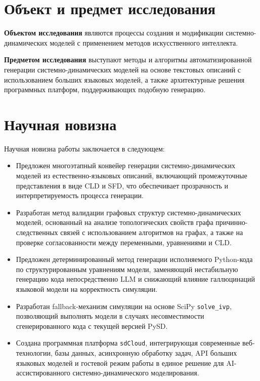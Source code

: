 \section*{Объект и предмет исследования}

\textbf{Объектом исследования} являются процессы создания и модификации системно-динамических моделей с применением методов искусственного интеллекта.

\textbf{Предметом исследования} выступают методы и алгоритмы автоматизированной генерации системно-динамических моделей на основе текстовых описаний с использованием больших языковых моделей, а также архитектурные решения программных платформ, поддерживающих подобную генерацию.

\section*{Научная новизна}

Научная новизна работы заключается в следующем:

\begin{itemize}
    \item Предложен многоэтапный конвейер генерации системно-динамических моделей из естественно-языковых описаний, включающий промежуточные представления в виде CLD и SFD, что обеспечивает прозрачность и интерпретируемость процесса генерации.

    \item Разработан метод валидации графовых структур системно-динамических моделей, основанный на анализе топологических свойств графа причинно-следственных связей с использованием алгоритмов на графах, а также на проверке согласованности между переменными, уравнениями и CLD.

    \item Предложен детерминированный метод генерации исполняемого Python-кода по структурированным уравнениям модели, заменяющий нестабильную генерацию кода непосредственно LLM и снижающий влияние галлюцинаций языковой модели на корректность симуляции.

    \item Разработан fallback-механизм симуляции на основе SciPy \texttt{solve\_ivp}, позволяющий выполнять модели в случаях несовместимости сгенерированного кода с текущей версией PySD.

    \item Создана программная платформа \texttt{sdCloud}, интегрирующая современные веб-технологии, базы данных, асинхронную обработку задач, API больших языковых моделей и гостевой режим работы в единое решение для AI-ассистированного системно-динамического моделирования.
\end{itemize}

